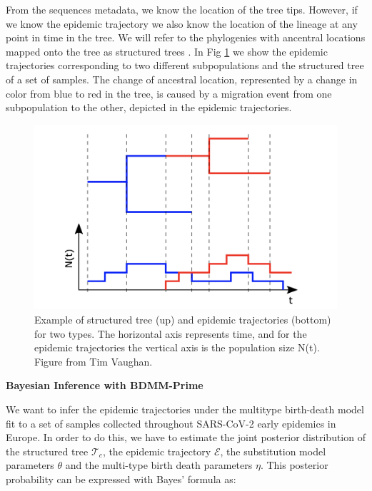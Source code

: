 From the sequences metadata, we know the location of the tree tips. However, if we know the epidemic trajectory we also know the location of the lineage at any point in time in the tree. We will refer to the phylogenies with ancentral locations mapped onto the tree as structured trees \cite{Vaughan2014}. In Fig \ref{fig:epitrajs} we show the epidemic trajectories corresponding to two different subpopulations and the structured tree of a set of samples. The change of ancestral location, represented by a change in color from blue to red in the tree, is caused by a migration event from one subpopulation to the other, depicted in the epidemic trajectories.

\begin{figure}[h]
    \centering
    \includegraphics[width=\textwidth]{figures/epitrajs.png}
    \caption{Example of structured tree (up) and epidemic trajectories (bottom) for two types. The horizontal axis represents time, and for the epidemic trajectories the vertical axis is the population size N(t). Figure from Tim Vaughan. }
    \label{fig:epitrajs}
\end{figure}

\textbf{Bayesian Inference with BDMM-Prime}

We want to infer the epidemic trajectories under the multitype birth-death model fit to a set of samples collected throughout SARS-CoV-2 early epidemics in Europe. In order to do this, we have to estimate the joint posterior distribution of the structured tree $\mathcal{T}_c$, the epidemic trajectory $\mathcal{E}$, the substitution model parameters $\theta$ and the multi-type birth death parameters $\eta$. This posterior probability can be expressed with Bayes' formula as:

